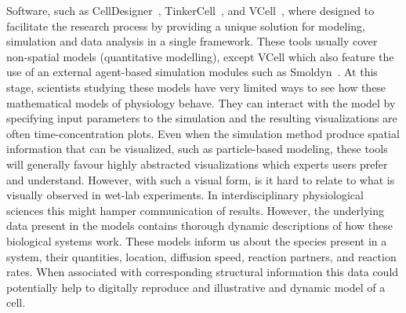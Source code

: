 Software, such as CellDesigner~\cite{funahashi2003celldesigner}, TinkerCell~\cite{chandran2009tinkercell}, and VCell~\cite{moraru2008virtual}, where designed to facilitate the research process by providing a unique solution for modeling, simulation and data analysis in a single framework.
These tools usually cover non-spatial models (quantitative modelling), except VCell which also feature the use of an external agent-based simulation modules such as Smoldyn~\cite{andrews2010detailed}.
At this stage, scientists studying these models have very limited ways to see how these mathematical models of physiology behave.
They can interact with the model by specifying input parameters to the simulation and the resulting visualizations are often time-concentration plots.
Even when the simulation method produce spatial information that can be visualized, such as particle-based modeling, these tools will generally favour highly abstracted visualizations which experts users prefer and understand.
However, with such a visual form, is it hard to relate to what is visually observed in wet-lab experiments. 
In interdisciplinary physiological sciences this might hamper communication of results. 
However, the underlying data present in the models contains thorough dynamic descriptions of how these biological systems work.
These models inform us about the species present in a system, their quantities, location, diffusion speed, reaction partners, and reaction rates.
When associated with corresponding structural information this data could potentially help to digitally reproduce and illustrative and dynamic model of a cell.

